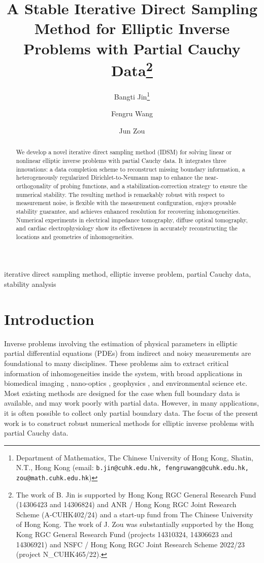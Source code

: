 \documentclass[onefignum,onetabnum]{siamart190516}
\title{A Stable Iterative Direct Sampling Method for Elliptic Inverse Problems with Partial Cauchy Data\thanks{The work of B. Jin is supported by Hong Kong RGC General Research Fund (14306423 and 14306824) and ANR / Hong Kong RGC Joint Research Scheme (A-CUHK402/24) and a start-up fund from The Chinese University of Hong Kong. The work of J. Zou was substantially supported by the Hong Kong RGC General Research Fund (projects 14310324, 14306623 and 14306921) and NSFC / Hong Kong RGC Joint Research Scheme 2022/23 (project N\_CUHK465/22).}}
\author{Bangti Jin\thanks{Department of Mathematics, The Chinese University of Hong Kong, Shatin, N.T., Hong Kong (email: \texttt{b.jin@cuhk.edu.hk, fengruwang@cuhk.edu.hk, zou@math.cuhk.edu.hk})}\and
Fengru Wang\footnotemark[2] \and
Jun Zou\footnotemark[2]}
\numberwithin{equation}{section}
\begin{document}
\maketitle

\begin{abstract}
We develop a novel iterative direct sampling method (IDSM) for solving linear or nonlinear elliptic inverse problems with partial Cauchy data.
It integrates three innovations: a data completion scheme to reconstruct missing boundary information, a heterogeneously regularized Dirichlet-to-Neumann map to enhance the near-orthogonality of probing functions, and a stabilization-correction strategy to ensure the numerical stability.
The resulting method is remarkably robust with respect to measurement noise, is flexible with the measurement configuration, enjoys provable stability guarantee, and achieves enhanced resolution for recovering inhomogeneities.
Numerical experiments in electrical impedance tomography, diffuse optical tomography, and cardiac electrophysiology show its effectiveness in accurately reconstructing the locations and geometries of inhomogeneities.
\end{abstract}

\begin{keywords}
iterative direct sampling method, elliptic inverse problem, partial Cauchy data, stability analysis
\end{keywords}


\section{Introduction} \label{sec:INT}

Inverse problems involving the estimation of physical parameters in elliptic partial differential equations (PDEs) from indirect and noisy measurements are foundational to many disciplines.
These problems aim to extract critical information of inhomogeneities inside the system, with broad applications in biomedical imaging \cite{Ammari2008}, nano-optics \cite{Novotny2006}, geophysics \cite{Zhdanov2015}, and environmental science \cite{ElBadia2002,Yakowitz1980} etc. {Most existing methods are designed for the case when full boundary data is available, and may work  poorly with partial data.
However, in many applications, it is often possible to collect only partial boundary data. The focus of the present work is to construct robust numerical methods for elliptic inverse problems with partial Cauchy data.}
\end{document}
